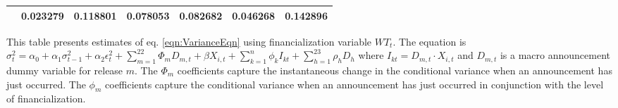 \begin{sidewaystable}
{\begin{tabular}{@{}lllllllllllll@{}}
&\multicolumn{2}{c}{ 0.023279 }                                                 & \multicolumn{2}{c}{ 0.118801 }                                                 & \multicolumn{2}{c}{ 0.078053 }                                                 & \multicolumn{2}{c}{ 0.082682 }                                                 & \multicolumn{2}{c}{ 0.046268 }                                                   & \multicolumn{2}{c}{ 0.142896 }                                                 \\ \bottomrule 
\end{tabular}
}
\begin{tablenotes}\item 
        \singlespacing
        \footnotesize
        This table presents estimates of eq. \ref{eqn:VarianceEqn} using financialization variable $WT_t$. The equation is $\sigma_{t}^2=\alpha_0+\alpha_1 \sigma_{t-1}^2+\alpha_2 \epsilon_t^2 +\sum_{m=1}^{22} \Phi_m D_{m,t}+\beta X_{i,t}+\sum_{k=1}^n \phi_k I_{kt} + \sum_{h=1}^{23} \rho_h D_h$ where $I_{kt}=D_{m,t} \cdot X_{i,t}$ and $D_{m,t}$ is a macro announcement dummy variable for release $m$. The $\Phi_m$ coefficients capture the instantaneous change in the conditional variance when an announcement has just occurred. The $\phi_m$ coefficients capture the conditional variance when an announcement has just occurred in conjunction with the level of financialization.
\end{tablenotes}
\end{sidewaystable}



